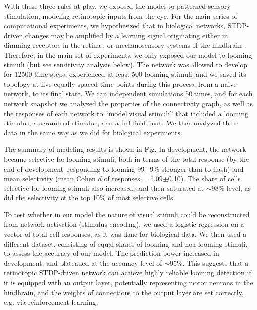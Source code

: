 \documentclass{article}
\begin{document}
With these three rules at play, we exposed the model to patterned sensory stimulation, modeling retinotopic inputs from the eye. For the main series of computational experiments, we hypothesized that in biological networks, STDP-driven changes may be amplified by a learning signal \citep{savin2014stdpreward,aswolinskiy2015stdpreward} originating either in dimming receptors in the retina \citep{baranauskas2012}, or mechanosensory systems of the hindbrain \citep{pratt2009multisens,felch2016,truszkowski2017}. Therefore, in the main set of experiments, we only exposed our model to looming stimuli (but see sensitivity analysis below). The network was allowed to develop for 12500 time steps, experienced at least 500 looming stimuli, and we saved its topology at five equally spaced time points during this process, from a naive network, to its final state. We ran independent simulations 50 times, and for each network snapshot we analyzed the properties of the connectivity graph, as well as the responses of each network to “model visual stimuli” that included a looming stimulus, a scrambled stimulus, and a full-field flash. We then analyzed these data in the same way as we did for biological experiments.

The summary of modeling results is shown in Fig. In development, the network became selective for looming stimuli, both in terms of the total response (by the end of development, responding to looming 99$\pm$9\% stronger than to flash) and mean selectivity (mean Cohen $d$ of responses = 1.09$\pm$0.10). The share of cells selective for looming stimuli also increased, and then saturated at $\sim$98\% level, as did the selectivity of the top 10\% of most selective cells.

To test whether in our model the nature of visual stimuli could be reconstructed from network activation (stimulus encoding), we used a logistic regression on a vector of total cell responses, as it was done for biological data. We then used a different dataset, consisting of equal shares of looming and non-looming stimuli, to assess the accuracy of our model. The prediction power increased in development, and plateaued at the accuracy level of $\sim$95\%. This suggests that a retinotopic STDP-driven network can achieve highly reliable looming detection if it is equipped with an output layer, potentially representing motor neurons in the hindbrain, and the weights of connections to the output layer are set correctly, e.g. via reinforcement learning.
\end{document}
